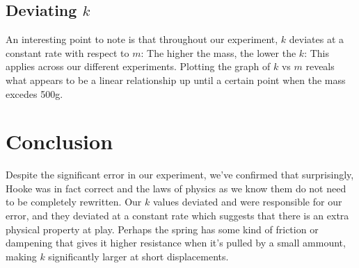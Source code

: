 \documentclass[12pt]{article}
\begin{document}
        \subsection{Deviating $k$}
            An interesting point to note is that throughout our experiment, $k$
            deviates at a constant rate with respect to $m$: The higher the mass,
            the lower the $k$: This applies across our different experiments.
            Plotting the graph of $k$ vs $m$ reveals what appears to be a linear
            relationship up until a certain point when the mass excedes 500g.
    \section{Conclusion}
        Despite the significant error in our experiment, we've confirmed that
        surprisingly, Hooke was in fact correct and the laws of physics as we
        know them do not need to be completely rewritten. Our $k$ values
        deviated and were responsible for our error, and they deviated at a
        constant rate which suggests that there is an extra physical property at
        play. Perhaps the spring has some kind of friction or dampening that gives
        it higher resistance when it's pulled by a small ammount, making $k$
        significantly larger at short displacements.
\end{document}
